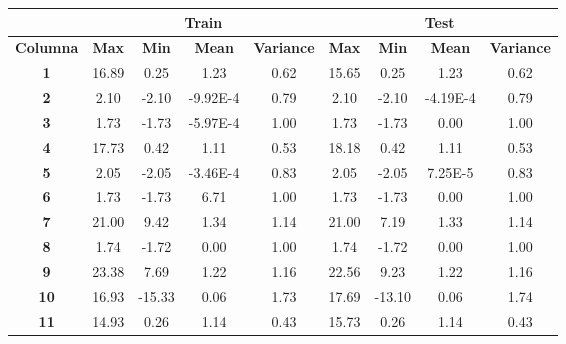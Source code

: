 \begin{table}[]
    \begin{tabular}{c|c|c|c|c||c|c|c|c|}
    \cline{2-9}
    \textbf{}                        & \multicolumn{4}{c|}{\textbf{Train}}                       & \multicolumn{4}{c|}{\textbf{Test}}                              \\ \hline
    \multicolumn{1}{|c|}{\textbf{Columna}} & \textbf{Max} & \textbf{Min} & \textbf{Mean} & \textbf{Variance} & \textbf{Max} & \textbf{Min} & \textbf{Mean} & \textbf{Variance} \\ \hline
    \multicolumn{1}{|c|}{\textbf{1}}          & 16.89  & 0.25   & 1.23    & 0.62        & 15.65  & 0.25   & 1.23    & 0.62              \\ \hline
    \multicolumn{1}{|c|}{\textbf{2}}          & 2.10   & -2.10  & -9.92E-4      & 0.79        & 2.10   & -2.10  & -4.19E-4      & 0.79              \\ \hline
    \multicolumn{1}{|c|}{\textbf{3}}          & 1.73   & -1.73  & -5.97E-4      & 1.00        & 1.73   & -1.73  & 0.00    & 1.00              \\ \hline
    \multicolumn{1}{|c|}{\textbf{4}}          & 17.73  & 0.42   & 1.11    & 0.53        & 18.18  & 0.42   & 1.11    & 0.53              \\ \hline
    \multicolumn{1}{|c|}{\textbf{5}}          & 2.05   & -2.05  & -3.46E-4      & 0.83        & 2.05   & -2.05  & 7.25E-5       & 0.83              \\ \hline
    \multicolumn{1}{|c|}{\textbf{6}}          & 1.73   & -1.73  & 6.71    & 1.00        & 1.73   & -1.73  & 0.00    & 1.00              \\ \hline
    \multicolumn{1}{|c|}{\textbf{7}}          & 21.00  & 9.42   & 1.34    & 1.14        & 21.00  & 7.19   & 1.33    & 1.14              \\ \hline
    \multicolumn{1}{|c|}{\textbf{8}}          & 1.74   & -1.72  & 0.00    & 1.00        & 1.74   & -1.72  & 0.00    & 1.00              \\ \hline
    \multicolumn{1}{|c|}{\textbf{9}}          & 23.38  & 7.69   & 1.22    & 1.16        & 22.56  & 9.23   & 1.22    & 1.16              \\ \hline
    \multicolumn{1}{|c|}{\textbf{10}}         & 16.93  & -15.33       & 0.06    & 1.73        & 17.69  & -13.10       & 0.06    & 1.74              \\ \hline
    \multicolumn{1}{|c|}{\textbf{11}}         & 14.93  & 0.26   & 1.14    & 0.43        & 15.73  & 0.26   & 1.14    & 0.43              \\ \hline

\end{tabular}
\end{table}
